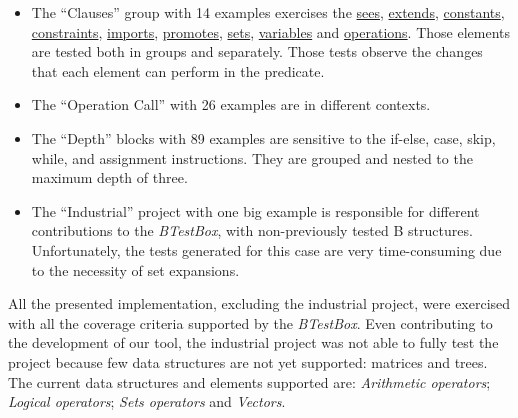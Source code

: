 \documentclass[runningheads]{llncs}
\begin{document}
\begin{itemize}
    \item The ``Clauses'' group with 14 examples exercises the \underline{sees}, \underline{extends}, \underline{constants}, \underline{constraints}, \underline{imports}, \underline{promotes}, \underline{sets}, \underline{variables} and \underline{operations}. Those elements are tested both in groups and separately. Those tests observe the changes that each element can perform in the predicate.
    
    \item The ``Operation Call'' with 26 examples are in different contexts.
    
    \item The ``Depth'' blocks with 89 examples are sensitive to the if-else, case, skip, while, and assignment instructions. They are grouped and nested to the maximum depth of three.
    
    \item The ``Industrial'' project with one big example is responsible for different contributions to the \textit{BTestBox}, with non-previously tested B structures. Unfortunately, the tests generated for this case are very time-consuming due to the necessity of set expansions.
\end{itemize}


All the presented implementation, excluding the industrial project, were exercised with all the coverage criteria supported by the \textit{BTestBox}. Even contributing to the development of our tool, the industrial project was not able to fully test the project because few data structures are not yet supported: matrices and trees. 
The current data structures and elements supported are: \textit{Arithmetic operators}; \textit{Logical operators};  \textit{Sets operators} and \textit{Vectors}.
\end{document}
